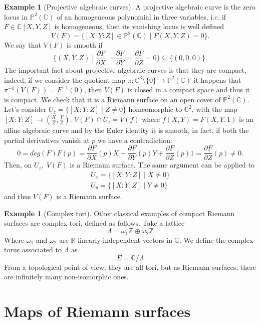 \documentclass[12pt,a4paper,openright,twoside]{report}
\theoremstyle{definition} %
\newtheorem{example}[theorem]{Example}
\def \R {\mathbb{R}}
\def \C {\mathbb{C}}
\def \Z {\mathbb{Z}}
\def \de {\partial}
\def \P {\mathbb{P}}
\begin{document}
\begin{example}[Projective algebraic curves]
    A projective algebraic curve is the zero locus in \(\P^2(\C)\) of an homogeneous polynomial in three variables, i.e. if \(F \in \C[X,Y,Z]\) is homogeneous, then its vanishing locus is well defined
    \[
    V(F) = \{[X:Y:Z] \in \P^2(\C) \mid F(X,Y,Z) = 0 \}.
    \]
    We say that \(V(F)\) is smooth if
    \[
    \{(X,Y,Z) \mid \frac{ \de F}{\de X} = \frac{ \de F}{\de Y} = \frac{ \de F}{\de Z} = 0\} \subseteq \{(0,0,0)\}.
    \]
    The important fact about projective algebraic curves is that they are compact, indeed, if we consider the quotient map \(\pi : \C^3 \setminus \{0\} \to \P^2(\C)\) it happens that \(\pi^{-1}(V(F)) = F^{-1}(0)\), then \(V(F)\) is closed in a compact space and thus it is compact.
    We check that it is a Riemann surface on an open cover of \(\P^2(\C)\).
    Let's consider \(U_z = \{[X:Y:Z] \mid Z \neq 0\}\) homeomorphic to \(\C^2\), with the map \([X:Y:Z] \to (\frac{X}{Z},\frac{Y}{Z})\).
    \(V(F) \cap U_z = V(f)\) where \(f(X,Y) = F(X,Y,1)\) is an affine algebraic curve and by the Euler identity it is smooth, in fact, if both the partial derivatives vanish at \(p\) we have a contradiction:
    \[
    0 = deg(F) F(p) = \frac{ \de F}{\de X}(p) X + \frac{ \de F}{\de Y}(p)Y + \frac{ \de F}{\de Z}(p) 1 = \frac{ \de F}{\de Z}(p) \neq  0.
    \]
    Then, on \(U_z , \; V(F)\) is a Riemann surface. The same argument can be applied to
    \begin{align*}
        U_x = \{[X:Y:Z] \mid X \neq 0\}\\
        U_y = \{[X:Y:Z] \mid Y \neq 0\}
    \end{align*}
    and thus \(V(F)\) is a Riemann surface.
\end{example}

\begin{example}[Complex tori]
    Other classical examples of compact Riemann surfaces are complex tori, defined as follows.
    Take a lattice
    \[\Lambda = \omega_1\Z \oplus \omega_2\Z\]
    Where \(\omega_1\) and \(\omega_2\) are \(\R\)-linearly independent vectors in \(\C\). We define the complex torus associated to \(\Lambda\) as
    \[E = \C/\Lambda\]
    From a topological point of view, they are all tori, but as Riemann surfaces, there are infinitely many non-isomorphic ones.
    
\end{example}

\section{Maps of Riemann surfaces}
\end{document}
